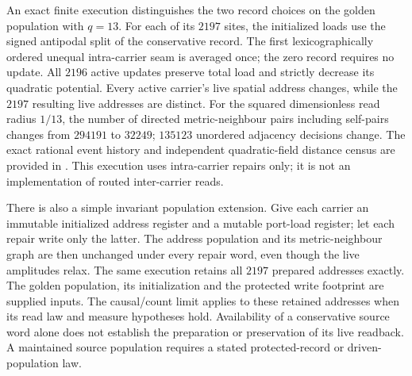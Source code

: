 An exact finite execution distinguishes the two record choices on the
golden population with $q=13$. For each of its $2197$ sites, the initialized
loads use the signed antipodal split of the conservative record. The first
lexicographically ordered unequal intra-carrier seam is averaged once;
the zero record requires no update. All $2196$ active updates preserve total
load and strictly decrease its quadratic potential. Every active carrier's
live spatial address changes, while the $2197$ resulting live addresses
are distinct. For the squared dimensionless read radius $1/13$, the number
of directed metric-neighbour pairs including self-pairs changes from
$294191$ to $32249$; $135123$ unordered adjacency decisions change.
The exact rational event history and independent quadratic-field distance
census are provided in . This execution uses
intra-carrier repairs only; it is not an implementation of routed
inter-carrier reads.

There is also a simple invariant population extension. Give each carrier
an immutable initialized address register and a mutable port-load register;
let each repair write only the latter. The address population and its
metric-neighbour graph are then unchanged under every repair word, even
though the live amplitudes relax. The same execution retains all $2197$
prepared addresses exactly. The golden population, its initialization and
the protected write footprint are supplied inputs. The causal/count limit
applies to these retained addresses when its read law and measure hypotheses
hold. Availability of a conservative source word alone does not establish
the preparation or preservation of its live readback. A maintained source
population requires a stated protected-record or driven-population law.
